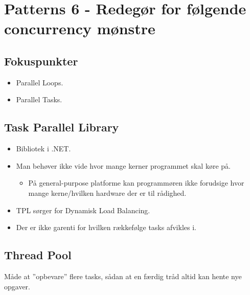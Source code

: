 
\section{Patterns 6 - Redegør for følgende concurrency mønstre}

\subsection{Fokuspunkter}

\begin{itemize}
	\item Parallel Loops.
	\item Parallel Tasks.
\end{itemize}

\subsection{Task Parallel Library}
\begin{itemize}
	\item Bibliotek i .NET.
	\item Man behøver ikke vide hvor mange kerner programmet skal køre på.
	\begin{itemize}
		\item På general-purpose platforme kan programmøren ikke forudsige hvor mange kerne/hvilken hardware der er til rådighed.
	\end{itemize}
	\item TPL sørger for Dynamisk Load Balancing.
	\item Der er ikke garenti for hvilken rækkefølge tasks afvikles i. 
\end{itemize}

\subsection{Thread Pool}
Måde at ''opbevare'' flere tasks, sådan at en færdig tråd altid kan hente nye opgaver.

